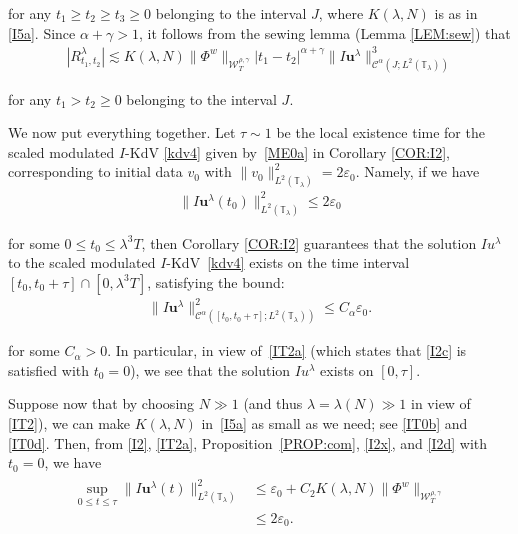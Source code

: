 \documentclass[letterpaper, 11pt,  reqno]{amsart}
\newcommand{\1}{\hspace{0.5mm}\text{I}\hspace{0.5mm}}
\newcommand{\noi}{\noindent}
\newcommand{\T}{\mathbb{T}}
\newcommand{\CC}{\mathcal{C}}
\newcommand{\al}{\alpha}
\newcommand{\eps}{\varepsilon}
\newcommand{\g}{\gamma}
\newcommand{\ld}{\lambda}
\newcommand{\les}{\lesssim}
\newcommand{\W}{\mathcal{W}}
\newcommand{\uu}{\mathbf{u}}
\numberwithin{equation}{section}
\numberwithin{theorem}{section}
\begin{document}
\noi
for any 
$t_1 \ge   t_2\ge t_3\ge 0$
belonging to the interval $J$, 
where $K(\ld, N)$ is as in \eqref{I5a}.
Since $\al + \g > 1$, 
it follows from the sewing lemma 
(Lemma \ref{LEM:sew}) 
that 
\begin{align}
|  R^\ld_{t_1,t_2} | \les 
K(\ld, N)   \|  \Phi^{w}  \|_{\W_{T}^{\rho, \g}}   
|t_1-t_2|^{\al + \g}  \|I \uu^\ld \|^3_{\CC^\al (J;L^2(\T_\ld))}
\label{I2x}
\end{align}

\noi
for any 
$t_1 >   t_2\ge 0$
belonging to the interval $J$.



We now put everything together.
Let   $\tau \sim 1$ be  the local existence time
for the scaled modulated $I$-KdV \eqref{kdv4}
given by~\eqref{ME0a} in Corollary \ref{COR:I2}, 
corresponding to initial data $v_0$ with 
$\|v_0 \|_{L^2(\T_\ld)}^2
= 2\eps_0$.
Namely, if we have 
\begin{align}
 \|I\uu^\ld(t_0)\|_{L^2(\T_\ld)}^2 \le 2\eps_0
\label{I2c}
\end{align}


\noi
for some 
 $0 \le t_0 \le \ld^3T$, 
then Corollary \ref{COR:I2}
guarantees that the solution $Iu^\ld$ to the scaled modulated $I$-KdV~\eqref{kdv4} exists on 
the time interval $[t_0, t_0 + \tau]\cap [0, \ld^3 T]$, satisfying the bound:
\begin{align}
 \| I\uu^\ld \|_{\CC^\al ([t_0, t_0 + \tau];L^2(\T_\ld))}^2\le C_\al \eps_0.
\label{I2d}
\end{align}

\noi
for some $C_\al > 0$.
In particular, in view of~\eqref{IT2a} (which states that \eqref{I2c} is satisfied with $t_0 = 0$), 
we see that 
 the solution $Iu^\ld$  exists on $[0, \tau]$.



Suppose now that by choosing $N \gg 1$
(and thus $\ld = \ld(N) \gg1$
in view of \eqref{IT2}), 
we can make 
 $K(\ld, N)$  in~\eqref{I5a}
as small as we need;
see \eqref{IT0b} and \eqref{IT0d}.
Then,  
from 
\eqref{I2}, \eqref{IT2a}, 
Proposition~\ref{PROP:com}, 
 \eqref{I2x}, 
and \eqref{I2d} with $t_0 = 0$,  
 we have 
\begin{align}
\begin{split}
 \sup_{0\le t\le \tau} \| I \uu^\ld(t) \|^2_{L^2(\T_\ld)} 
&  \le \eps_0 + 
C_2 K(\ld, N)   \|  \Phi^{w}  \|_{\W_{T}^{\rho, \g}}   \\
& \le 2\eps_0.
\end{split}
\label{I2e}
\end{align}
\end{document}
